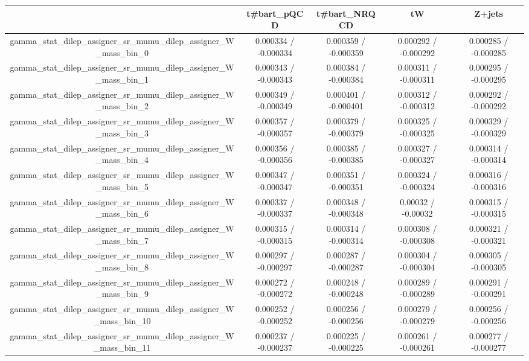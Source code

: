 \documentclass[10pt]{article}
\begin{document}
\begin{table}[htbp]
\begin{center}
\begin{tabular}{|c|c|c|c|c|}
\hline 
      & t#bar{t}_{pQCD}      & t#bar{t}_{NRQCD}      & tW      & Z+jets \\ 
\hline 
  gamma_stat_dilep_assigner_sr_mumu_dilep_assigner_W_mass_bin_0 & 0.000334 / -0.000334 & 0.000359 / -0.000359 & 0.000292 / -0.000292 & 0.000285 / -0.000285 \\ 
  gamma_stat_dilep_assigner_sr_mumu_dilep_assigner_W_mass_bin_1 & 0.000343 / -0.000343 & 0.000384 / -0.000384 & 0.000311 / -0.000311 & 0.000295 / -0.000295 \\ 
  gamma_stat_dilep_assigner_sr_mumu_dilep_assigner_W_mass_bin_2 & 0.000349 / -0.000349 & 0.000401 / -0.000401 & 0.000312 / -0.000312 & 0.000292 / -0.000292 \\ 
  gamma_stat_dilep_assigner_sr_mumu_dilep_assigner_W_mass_bin_3 & 0.000357 / -0.000357 & 0.000379 / -0.000379 & 0.000325 / -0.000325 & 0.000329 / -0.000329 \\ 
  gamma_stat_dilep_assigner_sr_mumu_dilep_assigner_W_mass_bin_4 & 0.000356 / -0.000356 & 0.000385 / -0.000385 & 0.000327 / -0.000327 & 0.000314 / -0.000314 \\ 
  gamma_stat_dilep_assigner_sr_mumu_dilep_assigner_W_mass_bin_5 & 0.000347 / -0.000347 & 0.000351 / -0.000351 & 0.000324 / -0.000324 & 0.000316 / -0.000316 \\ 
  gamma_stat_dilep_assigner_sr_mumu_dilep_assigner_W_mass_bin_6 & 0.000337 / -0.000337 & 0.000348 / -0.000348 & 0.00032 / -0.00032 & 0.000315 / -0.000315 \\ 
  gamma_stat_dilep_assigner_sr_mumu_dilep_assigner_W_mass_bin_7 & 0.000315 / -0.000315 & 0.000314 / -0.000314 & 0.000308 / -0.000308 & 0.000321 / -0.000321 \\ 
  gamma_stat_dilep_assigner_sr_mumu_dilep_assigner_W_mass_bin_8 & 0.000297 / -0.000297 & 0.000287 / -0.000287 & 0.000304 / -0.000304 & 0.000305 / -0.000305 \\ 
  gamma_stat_dilep_assigner_sr_mumu_dilep_assigner_W_mass_bin_9 & 0.000272 / -0.000272 & 0.000248 / -0.000248 & 0.000289 / -0.000289 & 0.000291 / -0.000291 \\ 
  gamma_stat_dilep_assigner_sr_mumu_dilep_assigner_W_mass_bin_10 & 0.000252 / -0.000252 & 0.000256 / -0.000256 & 0.000279 / -0.000279 & 0.000256 / -0.000256 \\ 
  gamma_stat_dilep_assigner_sr_mumu_dilep_assigner_W_mass_bin_11 & 0.000237 / -0.000237 & 0.000225 / -0.000225 & 0.000261 / -0.000261 & 0.000277 / -0.000277 \\ 

\end{tabular}
\end{center}
\end{table}
\end{document}
